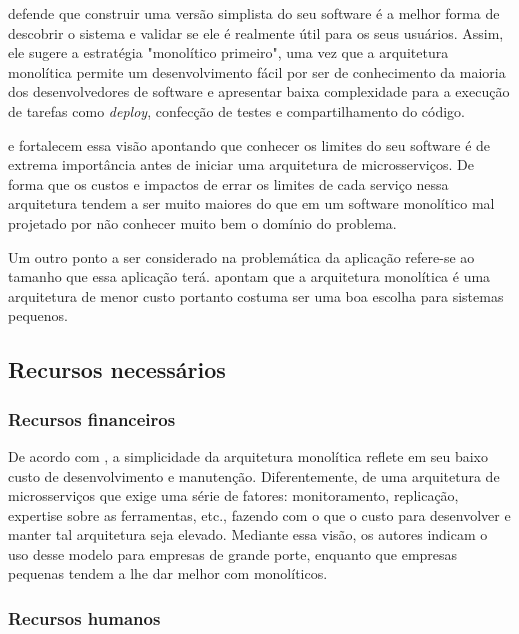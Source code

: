  defende que construir uma versão simplista do seu software é
a melhor forma de descobrir o sistema e validar se ele é realmente útil para os seus usuários.
Assim, ele sugere a estratégia "monolítico primeiro", uma vez que a arquitetura monolítica permite
um desenvolvimento fácil por ser de conhecimento da maioria dos desenvolvedores de software e
apresentar baixa complexidade para a execução de tarefas como \textit{deploy}, confecção de testes
e compartilhamento do código.

 e  fortalecem essa visão apontando
que conhecer os limites do seu software é de extrema importância antes de iniciar uma arquitetura de
microsserviços. De forma que os custos e impactos de errar os limites de cada serviço nessa arquitetura
tendem a ser muito maiores do que em um software monolítico mal projetado por não conhecer muito bem o
domínio do problema. 

Um outro ponto a ser considerado na problemática da aplicação refere-se ao tamanho que essa
aplicação terá.  apontam que a arquitetura
monolítica é uma arquitetura de menor custo portanto costuma ser uma boa escolha para sistemas
pequenos.

\subsection{Recursos necessários}

\subsubsection{Recursos financeiros}
\label{Perspectivas:recursosFinanceiros}

De acordo com , a simplicidade da arquitetura
monolítica reflete em seu baixo custo de desenvolvimento e manutenção. Diferentemente, de uma arquitetura
de microsserviços que exige uma série de fatores: monitoramento, replicação, expertise sobre as
ferramentas, etc., fazendo com o que o custo para desenvolver e manter tal arquitetura seja elevado.
Mediante essa visão, os autores indicam o uso desse modelo para empresas de grande porte,
enquanto que empresas pequenas tendem a lhe dar melhor com monolíticos.

\subsubsection{Recursos humanos}
\label{Perspectivas:recursosHumanos}

